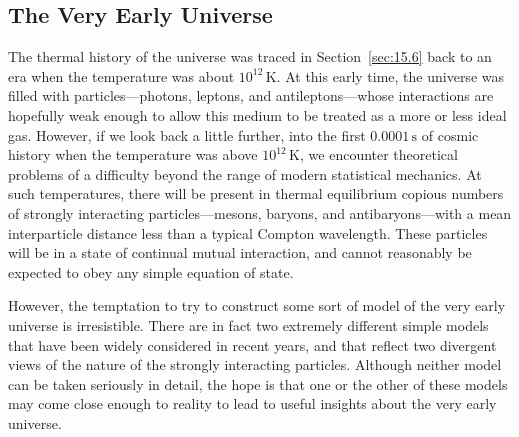 
\subsection{The Very Early Universe}\label{sec:15.11}

The thermal history of the universe was traced in Section~\ref{sec:15.6} back
to an era when the temperature was about \(10^{12}\,\mathrm K\). At this early
time, the universe was filled with particles---photons, leptons, and
antileptons---whose interactions are hopefully weak enough to allow this medium
to be treated as a more or less ideal gas. However, if we look back a little
further, into the first \(0.0001\,\mathrm s\) of cosmic history when the
temperature was above \(10^{12}\,\mathrm K\), we encounter theoretical
problems of a difficulty beyond the range of modern statistical mechanics. At
such temperatures, there will be present in thermal equilibrium copious numbers
of strongly interacting particles---mesons, baryons, and antibaryons---with a
mean interparticle distance less than a typical Compton wavelength. These
particles will be in a state of continual mutual interaction, and cannot
reasonably be expected to obey any simple equation of state.

However, the temptation to try to construct some sort of model of the very
early universe is irresistible. There are in fact two extremely different
simple models that have been widely considered in recent years, and that
reflect two divergent views of the nature of the strongly interacting
particles. Although neither model can be taken seriously in detail, the hope is
that one or the other of these models may come close enough to reality to lead
to useful insights about the very early universe.

